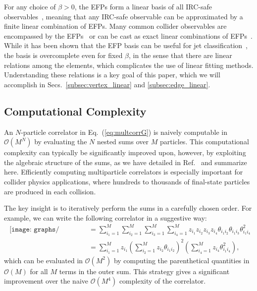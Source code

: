 \documentclass[aps,prd,floatfix,preprintnumbers,twocolumn,groupedaddress,nofootinbib,longbibliography,10pt]{revtex4-1}
\DeclareRobustCommand{\Secs}[2]{Secs.~\ref{#1} and \ref{#2}}
\DeclareRobustCommand{\Eq}[1]{Eq.~(\ref{#1})}
\DeclareRobustCommand{\Ref}[1]{Ref.~\cite{#1}}
\begin{document}
For any choice of $\beta > 0$, the EFPs form a linear basis of all IRC-safe observables~\cite{Komiske:2017aww}, meaning that any IRC-safe observable can be approximated by a finite linear combination of EFPs.
%
Many common collider observables are encompassed by the EFPs~\cite{Larkoski:2013eya,Moult:2016cvt} or can be cast as exact linear combinations of EFPs~\cite{Berger:2003iw,Almeida:2008yp,Ellis:2010rwa,Larkoski:2014uqa,Larkoski:2014pca}.
%
While it has been shown that the EFP basis can be useful for jet classification~\cite{Komiske:2017aww,Kasieczka:2019dbj}, the basis is overcomplete even for fixed $\beta$, in the sense that there are linear relations among the elements, which complicates the use of linear fitting methods.
%
Understanding these relations is a key goal of this paper, which we will accomplish in \Secs{subsec:vertex_linear}{subsec:edge_linear}.


\subsection{Computational Complexity}
\label{sec:complexity}


An $N$-particle correlator in \Eq{eq:multcorrG} is naively computable in $\mathcal O(M^N)$ by evaluating the $N$ nested sums over $M$ particles.
%
This computational complexity can typically be significantly improved upon, however, by exploiting the algebraic structure of the sums, as we have detailed in \Ref{Komiske:2017aww} and summarize here.
%
Efficiently computing multiparticle correlators is especially important for collider physics applications, where hundreds to thousands of final-state particles are produced in each collision.


The key insight is to iteratively perform the sums in a carefully chosen order.
%
For example, we can write the following correlator in a suggestive way:
\begin{align}
\label{eq:vecorr}
\begin{gathered}\texttt{[image: graphs/4\_4\_2.pdf]}\end{gathered}
&=\sum_{i_1=1}^M\sum_{i_2=1}^M\sum_{i_3=1}^M\sum_{i_4=1}^M z_{i_1}z_{i_2}z_{i_3}z_{i_4}\theta_{i_1i_2}\theta_{i_1i_3}\theta_{i_1i_4}^2 \nonumber
\\& = \sum_{i_1=1}^M z_{i_1}\left( \sum_{i_2=1}^M z_{i_2} \theta_{i_1i_2}\right)^2\left( \sum_{i_4=1}^M  z_{i_4}\theta_{i_1i_4}^2\right),
\end{align}
which can be evaluated in $\mathcal O(M^2)$ by computing the parenthetical quantities in $\mathcal O(M)$ for all $M$ terms in the outer sum.
%
This strategy gives a significant improvement over the naive $\mathcal O(M^4)$ complexity of the correlator.
\end{document}
